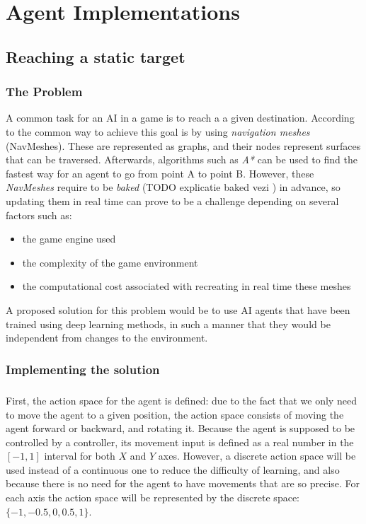 \chapter{Agent Implementations}
\section{Reaching a static target}
\subsection{The Problem} \label{static_target:the_problem}
A common task for an AI in a game is to reach a a given destination. According to \cite{alonso2020deeplearningnavigation} the common way to achieve this goal is by using \emph{navigation meshes} (NavMeshes). These are represented as graphs, and their nodes represent surfaces that can be traversed. Afterwards, algorithms such as \emph{A*} can be used to find the fastest way for an agent to go from point A to point B. However, these \emph{NavMeshes} require to be \emph{baked} (TODO explicatie baked vezi \cite{alonso2020deeplearningnavigation}) in advance, so updating them in real time can prove to be a challenge depending on several factors such as:
\begin{itemize}
    \item the game engine used
    \item the complexity of the game environment
    \item the computational cost associated with recreating in real time these meshes
\end{itemize}

A proposed solution for this problem would be to use AI agents that have been trained using deep learning methods, in such a manner that they would be independent from changes to the environment.

\subsection{Implementing the solution} \label{static_target:implementation}
\paragraph{}
First, the action space for the agent is defined: due to the fact that we only need to move the agent to a given position, the action space consists of moving the agent forward or backward, and rotating it. Because the agent is supposed to be controlled by a controller, its movement input is defined as a real number in the $[-1, 1]$ interval for both $X$ and $Y$ axes. However, a discrete action space will be used instead of a continuous one to reduce the difficulty of learning, and also because there is no need for the agent to have movements that are so precise. For each axis the action space will be represented by the discrete space: $\{-1, -0.5, 0, 0.5, 1\}$.

